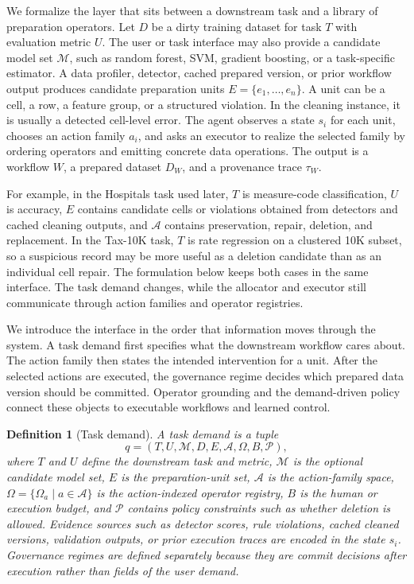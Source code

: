 \documentclass[sigconf, nonacm]{acmart}
\newtheorem{definition}{Definition}
\begin{document}
We formalize the layer that sits between a downstream task and a library of preparation operators. Let $D$ be a dirty training dataset for task $T$ with evaluation metric $U$. The user or task interface may also provide a candidate model set $\mathcal{M}$, such as random forest, SVM, gradient boosting, or a task-specific estimator. A data profiler, detector, cached prepared version, or prior workflow output produces candidate preparation units $E=\{e_1,\ldots,e_n\}$. A unit can be a cell, a row, a feature group, or a structured violation. In the cleaning instance, it is usually a detected cell-level error. The agent observes a state $s_i$ for each unit, chooses an action family $a_i$, and asks an executor to realize the selected family by ordering operators and emitting concrete data operations. The output is a workflow $W$, a prepared dataset $D_W$, and a provenance trace $\tau_W$.

For example, in the Hospitals task used later, $T$ is measure-code classification, $U$ is accuracy, $E$ contains candidate cells or violations obtained from detectors and cached cleaning outputs, and $\mathcal{A}$ contains preservation, repair, deletion, and replacement. In the Tax-10K task, $T$ is rate regression on a clustered 10K subset, so a suspicious record may be more useful as a deletion candidate than as an individual cell repair. The formulation below keeps both cases in the same interface. The task demand changes, while the allocator and executor still communicate through action families and operator registries.

We introduce the interface in the order that information moves through the system. A task demand first specifies what the downstream workflow cares about. The action family then states the intended intervention for a unit. After the selected actions are executed, the governance regime decides which prepared data version should be committed. Operator grounding and the demand-driven policy connect these objects to executable workflows and learned control.

\begin{definition}[Task demand]
A task demand is a tuple
\[
q=(T,U,\mathcal{M},D,E,\mathcal{A},\Omega,B,\mathcal{P}),
\]
where $T$ and $U$ define the downstream task and metric, $\mathcal{M}$ is the optional candidate model set, $E$ is the preparation-unit set, $\mathcal{A}$ is the action-family space, $\Omega=\{\Omega_a\mid a\in\mathcal{A}\}$ is the action-indexed operator registry, $B$ is the human or execution budget, and $\mathcal{P}$ contains policy constraints such as whether deletion is allowed. Evidence sources such as detector scores, rule violations, cached cleaned versions, validation outputs, or prior execution traces are encoded in the state $s_i$. Governance regimes are defined separately because they are commit decisions after execution rather than fields of the user demand.
\end{definition}
\end{document}
